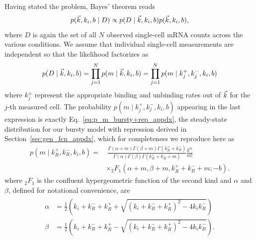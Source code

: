 Having stated the problem, Bayes' theorem reads
\begin{equation}
p(\vec{k}, k_i, b \mid D)
\propto
p(D \mid\vec{k}, k_i, b) p(\vec{k}, k_i, b),
\end{equation}
where $D$ is again the set of all $N$ observed single-cell mRNA counts
across the various conditions. We assume that individual single-cell
measurements are independent so that the likelihood factorizes as
\begin{equation}
p(D \mid\vec{k}, k_i, b)
= \prod_{j=1}^N p(m\mid \vec{k}, k_i, b)
= \prod_{j=1}^N p(m\mid k_j^+, k_j^-, k_i, b)
\end{equation}
where $k_j^\pm$ represent the appropriate binding and unbinding
rates out of $\vec{k}$ for the $j$-th measured cell. The probability
$p(m\mid k_j^+, k_j^-, k_i, b)$ appearing in the last expression
is exactly Eq.~\ref{eq:p_m_bursty+rep_appdx}, the steady-state
distribution for our bursty model with repression derived in
Section~\ref{sec:gen_fcn_appdx}, which for completeness we reproduce here as
\begin{equation}
\begin{split}
p(m \mid k_R^+, k_R^-, k_i, b) = & ~\frac{
        \Gamma(\alpha + m)\Gamma(\beta + m)\Gamma(k_R^+ + k_R^-)
        }
        {
        \Gamma(\alpha)\Gamma(\beta)\Gamma(k_R^+ + k_R^- + m)
        }
\frac{b^m}{m!}
\\
&\times {_2F_1}(\alpha+m, \beta+m, k_R^++k_R^-+m; -b).
\end{split}
\label{eq:p_m_bursty+rep}
\end{equation}
where $_2F_1$ is the confluent hypergeometric function of the second kind and
$\alpha$ and $\beta$, defined for notational convenience, are
\begin{align}
\begin{split}
\alpha &= \frac{1}{2}
\left(k_i+k_R^-+k_R^+ + \sqrt{(k_i+k_R^-+k_R^+)^2 - 4k_i k_R^-}\right)
\\
\beta &= \frac{1}{2}
\left(k_i+k_R^-+k_R^+ - \sqrt{(k_i+k_R^-+k_R^+)^2 - 4k_i k_R^-}\right).
\end{split}
\end{align}

